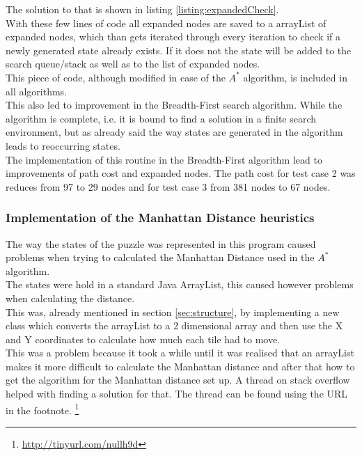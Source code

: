 \documentclass[journal]{IEEEtran}
\begin{document}
The solution to that is shown in listing \ref{listing:expandedCheck}. \\
With these few lines of code all expanded nodes are saved to a arrayList of expanded nodes, which than gets iterated through every iteration to check if a newly generated state already exists. If it does not the state will be added to the search queue/stack as well as to the list of expanded nodes. \\
This piece of code, although modified in case of the $A^*$ algorithm, is included in all algorithms. \\

This also led to improvement in the Breadth-First search algorithm. While the algorithm is complete, i.e. it is bound to find a solution in a finite search environment, but as already said the way states are generated in the algorithm leads to reoccurring states.\\
The implementation of this routine in the Breadth-First algorithm lead to improvements of path cost and expanded nodes. The path cost for test case 2 was reduces from 97 to 29 nodes and for test case 3 from 381 nodes to 67 nodes.\\

\subsubsection{Implementation of the Manhattan Distance heuristics}
The way the states of the puzzle was represented in this program caused problems when trying to calculated the Manhattan Distance used in the $A^*$ algorithm. \\
The states were hold in a standard Java ArrayList, this caused however problems when calculating the distance.\\ 
This was, already mentioned in section \ref{sec:structure}, by implementing a new class which converts the arrayList to a 2 dimensional array and then use the X and Y coordinates to calculate how much each tile had to move.\\
This was a problem because it took a while until it was realised that an arrayList makes it more difficult to calculate the Manhattan distance and after that how to get the algorithm for the Manhattan distance set up. A thread on stack overflow helped with finding a solution for that. The thread can be found using the URL in the footnote. \footnote{\url{http://tinyurl.com/nullh9d}}
\end{document}
